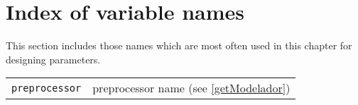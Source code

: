 \section{Index of variable names}
This section includes those names which are most often used in this chapter for designing parameters. 
\begin{center}
\begin{tabular}{lp{10cm}}
{\tt preprocessor} & preprocessor name (see \ref{getModelador})\\


\end{tabular}
\end{center}
